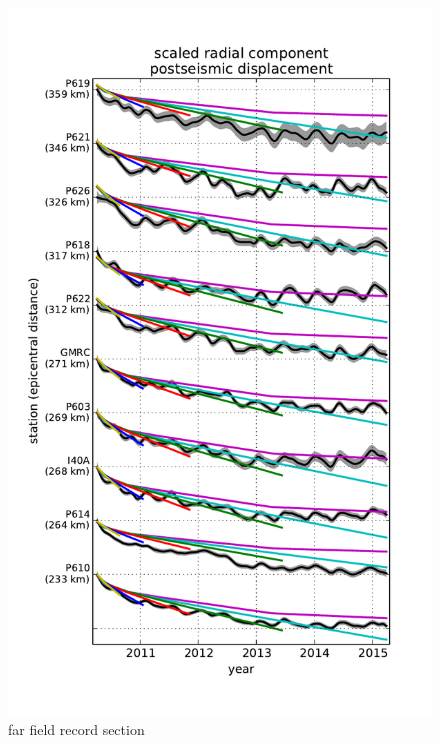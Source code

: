 \documentclass[12pt]{article}
\begin{document}
\begin{figure}
\includegraphics[scale=0.8]{Figures/far_field_record_section}
\centering 
\caption{far field record section}
\label{FarFieldRS}
\end{figure}        
\end{document}
